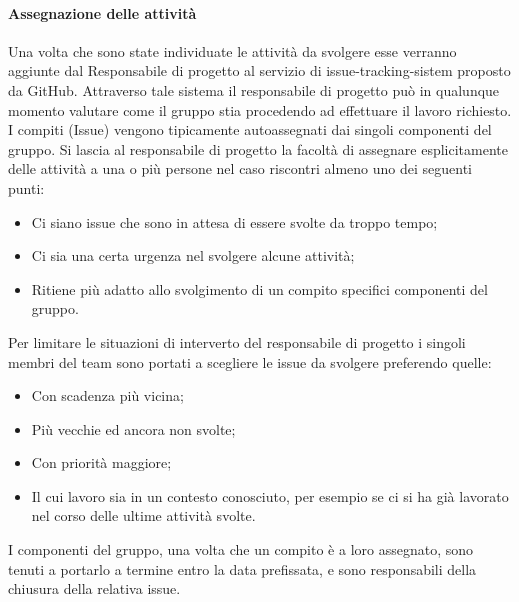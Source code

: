 \paragraph{Assegnazione delle attività}
Una volta che sono state individuate le attività da svolgere esse verranno aggiunte dal Responsabile di progetto al servizio di issue-tracking-sistem proposto da GitHub.
Attraverso tale sistema il responsabile di progetto può in qualunque momento valutare come il gruppo stia procedendo ad effettuare il lavoro richiesto.\\
I compiti (Issue) vengono tipicamente autoassegnati dai singoli componenti del gruppo. Si lascia al responsabile di progetto la facoltà di assegnare esplicitamente delle attività a una o più persone nel caso riscontri almeno uno dei seguenti punti:
\begin{itemize}
    \item Ci siano issue che sono in attesa di essere svolte da troppo tempo;
    \item Ci sia una certa urgenza nel svolgere alcune attività;
    \item Ritiene più adatto allo svolgimento di un compito specifici componenti del gruppo.
\end{itemize}
Per limitare le situazioni di interverto del responsabile di progetto i singoli membri del team sono portati a scegliere le issue da svolgere preferendo quelle:
\begin{itemize}
    \item Con scadenza più vicina;
    \item Più vecchie ed ancora non svolte;
    \item Con priorità maggiore;
    \item Il cui lavoro sia in un contesto conosciuto, per esempio se ci si ha già lavorato nel corso delle ultime attività svolte.
\end{itemize}
I componenti del gruppo, una volta che un compito è a loro assegnato, sono tenuti a portarlo a termine entro la data prefissata, e sono responsabili della chiusura della relativa issue.

